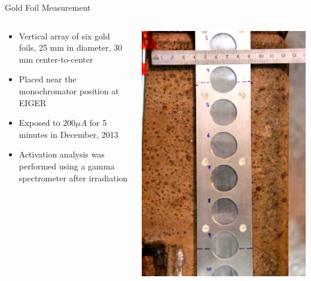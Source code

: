 \documentclass[final,t]{beamer}
\begin{document}
\begin{frame}{}
\begin{columns}[t]
\begin{column}{.3\linewidth}
      \begin{block}{Gold Foil Measurement}
        \begin{columns}[T]
          \begin{column}{.65\linewidth}
          \begin{itemize} 
          \item Vertical array of six gold foils, \alert{25 mm} in diameter, 30 mm center-to-center
          \item Placed near the monochromator position at EIGER
          \item Exposed to \alert{$200 \mu A$} for \alert{5 minutes} in December, 2013
          \item Activation analysis was performed using a gamma spectrometer after irradiation
          \end{itemize}

            
          \end{column}
          \begin{column}{.35\linewidth}
            \includegraphics*[angle=90,width=\linewidth]{foils.eps}
          \end{column}
        \end{columns}
      \end{block}


\end{column}
\end{columns}
\end{frame}
\end{document}
